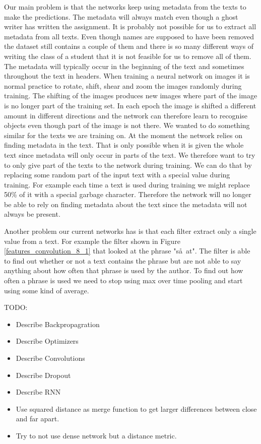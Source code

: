 Our main problem is that the networks keep using metadata from the texts to
make the predictions. The metadata will always match even though a ghost writer
has written the assignment. It is probably not possible for us to extract all
metadata from all texts. Even though names are supposed to have been removed
the dataset still contains a couple of them and there is so many different ways
of writing the class of a student that it is not feasible for us to remove
all of them. The metadata will typically occur in the beginning of the text
and sometimes throughout the text in headers. When training a neural network
on images it is normal practice to rotate, shift, shear and zoom the images
randomly during training. The shifting of the images produces new images where
part of the image is no longer part of the training set. In each epoch the
image is shifted a different amount in different directions and the network can
therefore learn to recognise objects even though part of the image is not there.
We wanted to do something similar for the texts we are training on. At the
moment the network relies on finding metadata in the text. That is only possible
when it is given the whole text since metadata will only occur in parts of the
text. We therefore want to try to only give part of the texts to the network
during training. We can do that by replacing some random part of the input text
with a special value during training. For example each time a text is used
during training we might replace 50\% of it with a special garbage character.
Therefore the network will no longer be able to rely on finding metadata about
the text since the metadata will not always be present.

Another problem our current networks has is that each filter extract only a
single value from a text. For example the filter shown in Figure
\ref{features_convolution_8_1} that looked at the phrase "s\aa\ at". The filter
is able to find out whether or not a text contains the phrase but are not able
to say anything about how often that phrase is used by the author. To find out
how often a phrase is used we need to stop using max over time pooling and start
using some kind of average.

TODO:
\begin{itemize}
    \item Describe Backpropagration
    \item Describe Optimizers
    \item Describe Convolutions
    \item Describe Dropout
    \item Describe RNN
    \item Use squared distance as merge function to get larger differences
        between close and far apart.
    \item Try to not use dense network but a distance metric.
\end{itemize}
